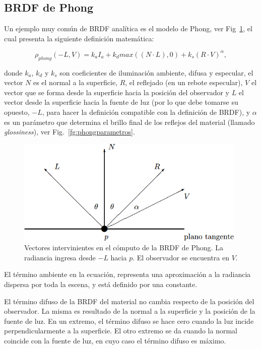 \subsection{BRDF de Phong}
Un ejemplo muy común de BRDF analítica es el modelo de Phong, ver Fig~\ref{fg:phongVecs}, el cual presenta la siguiente definición matemática:

$$\rho_{phong}(-L,V) =  k_{a} I_{a} + k_{d} max((N \cdot L),0) + k_{s} (R \cdot V)^{\alpha},$$

donde $k_{a}$, $k_{d}$ y $k_{s}$ son coeficientes de iluminación ambiente, difusa y especular, el vector $N$ es el normal a la superficie, $R$, el reflejado (en un rebote especular), $V$ el vector  que se forma desde la superficie hacia la posición del observador y $L$ el vector desde la superficie hacia la fuente de luz (por lo que debe tomarse su opuesto, $-L$, para hacer la definición compatible con la definición de BRDF), y $\alpha$ es un parámetro que determina el brillo final de los reflejos del material (llamado {\em glossiness}), ver Fig.~\ref{fg:phongparametros}.


\begin{figure}
\center
\includegraphics[width=11cm]{figures/phongVecs}
\caption[Vectores intervinientes en el cómputo de la BRDF de Phong]{Vectores intervinientes en el cómputo de la BRDF de Phong. La radiancia ingresa desde $-L$ hacia $p$. El observador se encuentra en $V$.}
\label{fg:phongVecs}
\end{figure}

El término ambiente en la ecuación, representa una aproximación a la radiancia dispersa por toda la escena, y está definido por una constante.

El término difuso de la BRDF del material no cambia respecto de la posición del observador.
La misma es resultado de la normal a la superficie y la posición de la fuente de luz.
En un extremo, el término difuso se hace cero cuando la luz incide perpendicularmente a la superficie.
El otro extremo se da cuando la normal coincide con la fuente de luz, en cuyo caso el término difuso es máximo.

